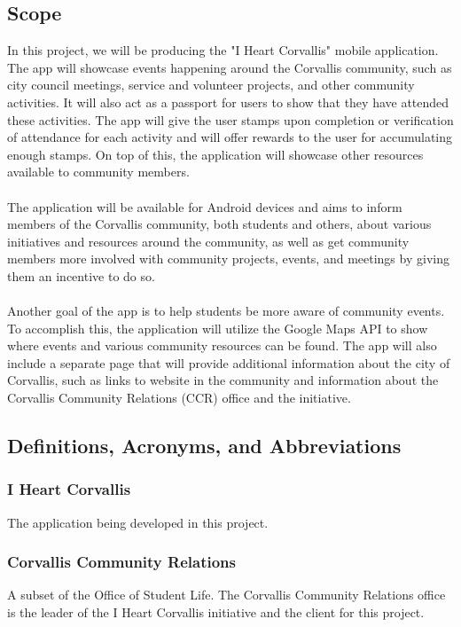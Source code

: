 \documentclass[draftclsnofoot, onecolumn, 10pt, compsoc]{IEEEtran}
\begin{document}
		\subsection{Scope}
			In this project, we will be producing the "I Heart Corvallis" mobile application. The app will showcase events happening around the Corvallis community, such as city council meetings, service and volunteer projects, and other community activities. It will also act as a passport for users to show that they have attended these activities. The app will give the user stamps upon completion or verification of attendance for each activity and will offer rewards to the user for accumulating enough stamps. On top of this, the application will showcase other resources available to community members. \\ \\
			The application will be available for Android devices and aims to inform members of the Corvallis community, both students and others, about various initiatives and resources around the community, as well as get community members more involved with community projects, events, and meetings by giving them an incentive to do so. \\ \\
			Another goal of the app is to help students be more aware of community events.  To accomplish this, the application will utilize the Google Maps API to show where events and various community resources can be found. The app will also include a separate page that will provide additional information about the city of Corvallis, such as links to website in the community and information about the Corvallis Community Relations (CCR) office and the initiative.
			
		\subsection{Definitions, Acronyms, and Abbreviations}
			\subsubsection{I Heart Corvallis} The application being developed in this project.
			\subsubsection{Corvallis Community Relations} A subset of the Office of Student Life. The Corvallis Community Relations office is the leader of the I Heart Corvallis initiative and the client for this project.
\end{document}
